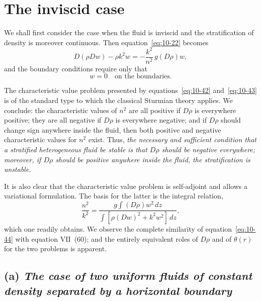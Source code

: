 \section{The inviscid case}\label{sec:92}

We shall first consider the case when the fluid is inviscid and the stratification of density is moreover continuous. Then equation~\eqref{eq:10-22} becomes
\begin{equation}
\label{eq:10-42}
D(\rho Dw) - \rho k^2w = -\frac{k^2}{n^2}\,g(D\rho)w,
\end{equation}
and the boundary conditions require only that
\begin{equation}
\label{eq:10-43}
w = 0 \quad\text{on the boundaries.}
\end{equation}

The characteristic value problem presented by equations~\eqref{eq:10-42} and~\eqref{eq:10-43} is of the standard type to which the classical Sturmian theory applies. We conclude: the characteristic values of $n^2$ are all positive if $D\rho$ is everywhere positive; they are all negative if $D\rho$ is everywhere negative; and if $D\rho$ should change sign anywhere inside the fluid, then both positive and negative characteristic values for $n^2$ exist. Thus, \emph{the necessary and sufficient condition that a stratified heterogeneous fluid be stable is that $D\rho$ should be negative everywhere; moreover, if $D\rho$ should be positive anywhere inside the fluid, the stratification is unstable.}

It is also clear that the characteristic value problem is self-adjoint and allows a variational formulation. The basis for the latter is the integral relation,
\begin{equation}
\label{eq:10-44}
\frac{n^2}{k^2} = \frac{g\int(D\rho)w^2\,dz}{\int[\rho(Dw)^2+k^2w^2]\,dz},
\end{equation}
which one readily obtains. We observe the complete similarity of equation~\eqref{eq:10-44} with equation VII~(60); and the entirely equivalent roles of $D\rho$ and of $\theta(r)$ for the two problems is apparent.

\subsection*{(a) \textit{The case of two uniform fluids of constant density separated by a horizontal boundary}}

